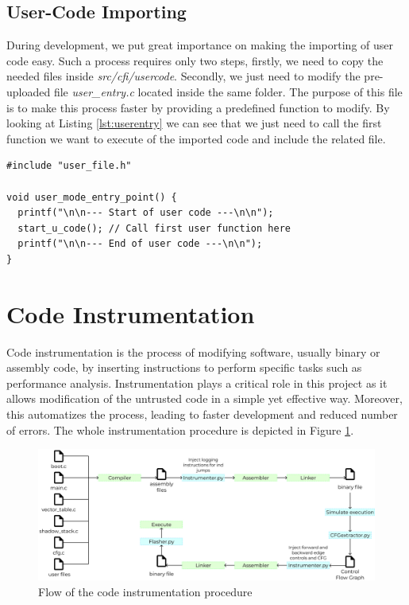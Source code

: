 \subsection{User-Code Importing}
\label{subsec:project_ucodeimport}

During development, we put great importance on making the importing of user code
easy. Such a process requires only two steps, firstly, we need to copy the
needed files inside \textit{src/cfi/usercode}. Secondly, we just need to modify the
pre-uploaded file \textit{user\_entry.c} located inside the same folder. The purpose
of this file is to make this process faster by providing a predefined function to
modify. By looking at Listing \ref{lst:userentry} we can see that we just need
to call the first function we want to execute of the imported code and include
the related file. \\ \begin{lstlisting}[style=CStyle, caption = \textit{user\_entry.c} file, label={lst:userentry}]
#include "user_file.h"

void user_mode_entry_point() {
  printf("\n\n--- Start of user code ---\n\n");
  start_u_code(); // Call first user function here
  printf("\n\n--- End of user code ---\n\n");
}
\end{lstlisting}

\section{Code Instrumentation}
\label{sec:project_instrumentation}

Code instrumentation is the process of modifying software, usually binary or
assembly code, by inserting instructions to perform specific tasks such as performance
analysis. Instrumentation plays a critical role in this project as it allows
modification of the untrusted code in a simple yet effective way. Moreover, this
automatizes the process, leading to faster development and reduced number of errors.
The whole instrumentation procedure is depicted in Figure
\ref{fig:instrumentation}. \\
\begin{figure}[htbp]
  \centering
  \includegraphics[width=.9\linewidth]{images/instrumentation.png}
  \caption{Flow of the code instrumentation procedure}
  \label{fig:instrumentation}
\end{figure}
\\

